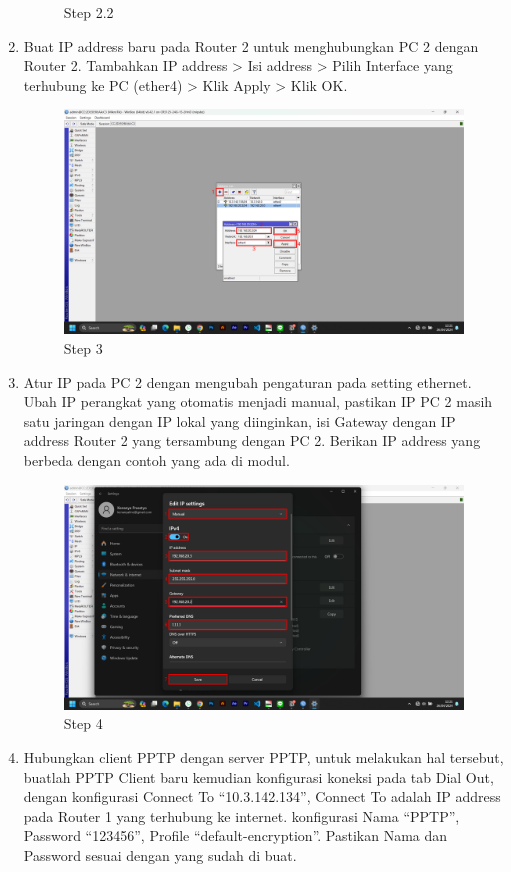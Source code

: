 \begin{center}
\begin{enumerate}
\begin{figure}[H]
			\caption{Step 2.2}
			\label{fig:Step 2.2(PC 2)}
		\end{figure}
        \item Buat IP address baru pada Router 2 untuk menghubungkan PC 2 dengan Router 2. Tambahkan IP address > Isi address > Pilih Interface yang terhubung ke PC (ether4) > Klik Apply > Klik OK.
        \begin{figure}[H]
			\centering
			\includegraphics[width=0.8\linewidth]{P4/img/pc2/Step 3.png}
			\caption{Step 3}
			\label{fig:Step 3(PC 2)}
		\end{figure}
        \item Atur IP pada PC 2 dengan mengubah pengaturan pada setting ethernet. Ubah IP perangkat yang otomatis menjadi manual, pastikan IP PC 2 masih satu jaringan dengan IP lokal yang diinginkan, isi Gateway dengan IP address Router 2 yang tersambung dengan PC 2. Berikan IP address yang berbeda dengan contoh yang ada di modul.
        \begin{figure}[H]
			\centering
			\includegraphics[width=0.8\linewidth]{P4/img/pc2/Step 4.png}
			\caption{Step 4}
			\label{fig:Step 4(PC 2)}
		\end{figure}
        \item Hubungkan client PPTP dengan server PPTP, untuk melakukan hal tersebut, buatlah PPTP Client baru kemudian konfigurasi koneksi pada tab Dial Out, dengan konfigurasi Connect To “10.3.142.134”, Connect To adalah IP address pada Router 1 yang terhubung ke internet. konfigurasi Nama “PPTP”, Password “123456”, Profile “default-encryption”. Pastikan Nama dan Password sesuai dengan yang sudah di buat.

\end{enumerate}
\end{center}
